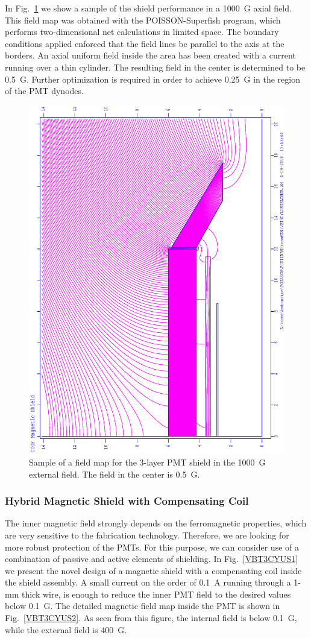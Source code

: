 In Fig.~\ref{VBT3CYFM} we show a sample of the shield performance in a
1000~G axial field.  This field map was obtained with the POISSON-Superfish  
program,  which performs two-dimensional net calculations in limited space.
The boundary conditions applied enforced that the field lines be parallel to 
the axis at the borders.  An axial uniform field inside the area has been  
created with a current running over a thin cylinder.  The resulting field in 
the center is determined to be 0.5~G.  Further optimization is required in order 
to achieve 0.25~G in the region of the PMT dynodes.

\begin{figure}[htbp]
\centering
\includegraphics[width=.6\textwidth]{VBT3CYLSHIELDNUB02.eps}
\caption{\small{Sample of a field map for the 3-layer PMT shield in the 
1000~G external field.  The field in the center is 0.5~G.}}
\label{VBT3CYFM}
\end{figure}

\subsubsection{Hybrid Magnetic Shield with Compensating Coil}

The inner magnetic field strongly depends on the ferromagnetic properties, which 
are very sensitive to the fabrication technology.  Therefore, we are looking for 
more robust protection of the PMTs.  For this purpose, we can consider use of a   
combination of passive and active elements of shielding.  In Fig.~\ref{VBT3CYUS1} 
we present the novel design of a magnetic shield with a compensating coil inside the 
shield assembly.  A small current on the order of 0.1~A running through a 1-mm thick 
wire, is enough to reduce the inner PMT field to the desired values below 0.1~G.
The detailed magnetic field map inside the PMT is shown in Fig.~\ref{VBT3CYUS2}.
As seen from this figure, the internal field is below 0.1~G, while the external field 
is 400~G.


